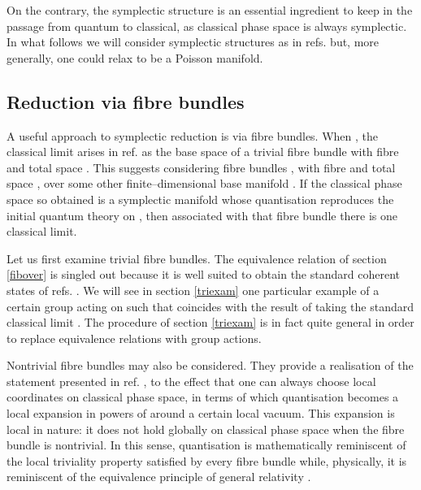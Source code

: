 \documentclass[a4paper,a4paper]{article}
\begin{document}
On the contrary, the symplectic structure is an essential ingredient to keep in the passage 
from quantum to classical, as classical phase space is always symplectic. 
In what follows we will consider symplectic structures as in refs. \cite{GS, MUELLER} but, 
more generally, one could relax \coordHE{} to be a Poisson manifold. 

\subsection{Reduction via fibre bundles}\label{diffib}

A useful approach to symplectic reduction is via fibre bundles. 
When \coordHE{}, the classical limit arises in ref. \cite{ASHTEKAR} 
as the base space of a trivial fibre bundle with fibre \coordHE{} and total space \coordHE{}. 
This suggests considering fibre bundles \coordHE{}, with fibre \coordHE{} 
and total space \coordHE{}, over some other finite--dimensional base manifold \coordHE{}.
If the classical phase space \coordHE{} so obtained is a symplectic manifold 
whose  quantisation reproduces the initial quantum theory on \coordHE{}, 
then associated with that fibre bundle there is one classical limit.

Let us first examine trivial fibre bundles. The equivalence relation of section \ref{fibover} 
is singled out because it is well suited to obtain the standard coherent states of refs. 
\cite{COHST, PERELOMOV}. We will see in section \ref{triexam} one particular example 
of a certain group \coordHE{} acting on \coordHE{} such that \coordHE{} coincides 
with the result of taking the standard classical limit \coordHE{}. The procedure 
of section \ref{triexam} is in fact quite general in order to replace equivalence relations 
with group actions.

Nontrivial fibre bundles may also be considered. They provide a realisation of the statement 
presented in ref. \cite{NOS}, to the effect that one can always choose local 
coordinates on classical phase space, in terms of which quantisation 
becomes a local expansion in powers of \myHighlight{${\hbar}$}\coordHE{} around a certain local 
vacuum.
This expansion is local in nature: it does not hold globally on classical phase space
when the fibre bundle is nontrivial. In this sense, quantisation is 
mathematically reminiscent of the local triviality property satisfied by every 
fibre bundle \cite{STEENROD} while, physically, it is reminiscent of the 
equivalence principle of general relativity \cite{WEINBERG}.
\end{document}
